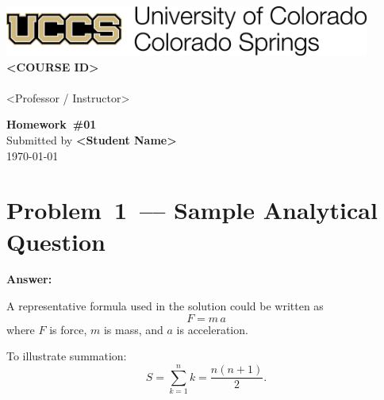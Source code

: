 \documentclass[12pt]{article}
\newenvironment{problem}{\color{dodblue}\itshape}{\par}
\newcommand{\homeworknum}{01}  %
\begin{document}
\begin{center}
    \includegraphics[width=0.9\textwidth,keepaspectratio]{uccs-logo.png}\\[8\baselineskip]

    {\HeadingFont\fontsize{24}{26}\selectfont\textbf{<COURSE ID>}}\\[0.25\baselineskip]
    {}\\[0.15\baselineskip]
    {\small <Professor / Instructor>}\\[2\baselineskip]
\vfill

    {\HeadingFont\fontsize{20}{22}\selectfont\textbf{Homework~\#\homeworknum}}\\[0.5\baselineskip]
    {Submitted by \textbf{<Student Name>}}\\[0.15\baselineskip]
    {\today}
\end{center}

\newpage

\section*{Problem 1 –– Sample Analytical Question}
\begin{problem}
\lipsum[1]
\end{problem}

\textbf{Answer:}\\
\lipsum[2]

A representative formula used in the solution could be written as
\begin{equation}\label{eq:newton}
F = m\,a
\end{equation}
where $F$ is force, $m$ is mass, and $a$ is acceleration.

To illustrate summation:
\begin{equation}
S = \sum_{k=1}^{n} k = \frac{n(n+1)}{2}.
\end{equation}

\end{document}
